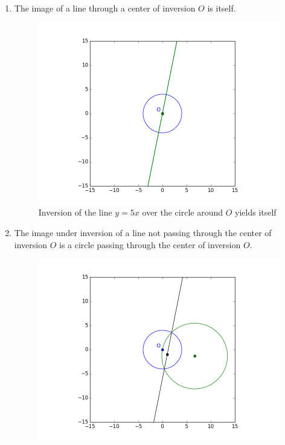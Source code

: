 \documentclass[a4paper,12pt]{article}
\numberwithin{figure}{section}
\begin{document}
        \begin{enumerate}[leftmargin=25mm,label=\textbf{Theorem \arabic*:}]
            \item The image of a line through a center of inversion $O$ is itself.
            \begin{figure}[H]
                \centering
                \includegraphics[scale=0.6]{./pictures/INVERT_LINE_CENTER}
                \caption{Inversion of the line $y=5x$ over the circle around $O$ yields itself}
                \label{fig:lcenter}
            \end{figure}
            \newpage
            \item The image under inversion of a line not passing through the center of inversion $O$ is a circle passing through the center of inversion $O$.
            \begin{figure}[H]
                \centering
                \includegraphics[scale=0.6]{./pictures/INVERT_LINE_OFFCENTER}

\end{figure}
\end{enumerate}
\end{document}
